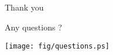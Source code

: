 \documentclass[compress,red]{beamer}
\begin{document}
\subsection{}
\begin{frame}{Thank you}

    \begin{center}
    Any questions ?
    \end{center}

    
    \begin{center}
    \texttt{[image: fig/questions.ps]}
    \end{center}

\end{frame}
\end{document}
